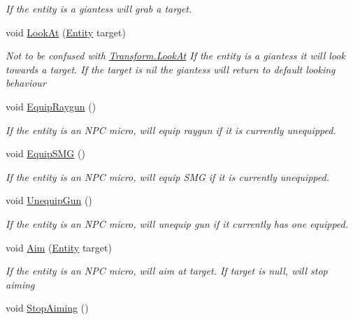 \begin{DoxyCompactItemize}
\begin{DoxyCompactList}\small\item\em If the entity is a giantess will grab a target. \end{DoxyCompactList}\item 
void \mbox{\hyperlink{class_lua_1_1_entity_a29cdb052c5422873a708c8080039cb4b}{Look\+At}} (\mbox{\hyperlink{class_lua_1_1_entity}{Entity}} target)
\begin{DoxyCompactList}\small\item\em Not to be confused with \mbox{\hyperlink{class_lua_1_1_transform_a1e722de9c3eacff82477ab7684a67553}{Transform.\+Look\+At}} If the entity is a giantess it will look towards a target. If the target is nil the giantess will return to default looking behaviour \end{DoxyCompactList}\item 
void \mbox{\hyperlink{class_lua_1_1_entity_a23180e62c487b6c3923e39b3be84b291}{Equip\+Raygun}} ()
\begin{DoxyCompactList}\small\item\em If the entity is an N\+PC micro, will equip raygun if it is currently unequipped. \end{DoxyCompactList}\item 
void \mbox{\hyperlink{class_lua_1_1_entity_aaa24b31446f5c0087faa4030f91e80ac}{Equip\+S\+MG}} ()
\begin{DoxyCompactList}\small\item\em If the entity is an N\+PC micro, will equip S\+MG if it is currently unequipped. \end{DoxyCompactList}\item 
void \mbox{\hyperlink{class_lua_1_1_entity_a1a4cc3d2425ef3527ab0692f4c2a9ca3}{Unequip\+Gun}} ()
\begin{DoxyCompactList}\small\item\em If the entity is an N\+PC micro, will unequip gun if it currently has one equipped. \end{DoxyCompactList}\item 
void \mbox{\hyperlink{class_lua_1_1_entity_ac47475b1b0342f1e6ce52aca2eec7f38}{Aim}} (\mbox{\hyperlink{class_lua_1_1_entity}{Entity}} target)
\begin{DoxyCompactList}\small\item\em If the entity is an N\+PC micro, will aim at target. If target is null, will stop aiming \end{DoxyCompactList}\item 
void \mbox{\hyperlink{class_lua_1_1_entity_aadc969ba1387cf03d80b8432705f0750}{Stop\+Aiming}} ()

\end{DoxyCompactItemize}
